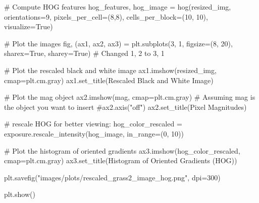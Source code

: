 \documentclass[
  letterpaper,
  DIV=11,
  numbers=noendperiod]{scrreprt}
\newenvironment{Shaded}{\begin{snugshade}}{\end{snugshade}}
\newcommand{\CommentTok}[1]{\textcolor[rgb]{0.37,0.37,0.37}{#1}}
\newcommand{\DecValTok}[1]{\textcolor[rgb]{0.68,0.00,0.00}{#1}}
\newcommand{\NormalTok}[1]{\textcolor[rgb]{0.00,0.23,0.31}{#1}}
\newcommand{\OperatorTok}[1]{\textcolor[rgb]{0.37,0.37,0.37}{#1}}
\newcommand{\StringTok}[1]{\textcolor[rgb]{0.13,0.47,0.30}{#1}}
\newcommand{\VariableTok}[1]{\textcolor[rgb]{0.07,0.07,0.07}{#1}}
\begin{document}
\begin{Shaded}
\begin{Highlighting}[]
\CommentTok{\# Compute HOG features}
\NormalTok{hog\_features, hog\_image }\OperatorTok{=}\NormalTok{ hog(resized\_img, orientations}\OperatorTok{=}\DecValTok{9}\NormalTok{, pixels\_per\_cell}\OperatorTok{=}\NormalTok{(}\DecValTok{8}\NormalTok{,}\DecValTok{8}\NormalTok{),}
\NormalTok{                              cells\_per\_block}\OperatorTok{=}\NormalTok{(}\DecValTok{10}\NormalTok{, }\DecValTok{10}\NormalTok{), visualize}\OperatorTok{=}\VariableTok{True}\NormalTok{)}

\CommentTok{\# Plot the images}
\NormalTok{fig, (ax1, ax2, ax3) }\OperatorTok{=}\NormalTok{ plt.subplots(}\DecValTok{3}\NormalTok{, }\DecValTok{1}\NormalTok{, figsize}\OperatorTok{=}\NormalTok{(}\DecValTok{8}\NormalTok{, }\DecValTok{20}\NormalTok{), sharex}\OperatorTok{=}\VariableTok{True}\NormalTok{, sharey}\OperatorTok{=}\VariableTok{True}\NormalTok{)  }\CommentTok{\# Changed 1, 2 to 3, 1}

\CommentTok{\# Plot the rescaled black and white image}
\NormalTok{ax1.imshow(resized\_img, cmap}\OperatorTok{=}\NormalTok{plt.cm.gray)}
\NormalTok{ax1.set\_title(}\StringTok{\textquotesingle{}Rescaled Black and White Image\textquotesingle{}}\NormalTok{)}

\CommentTok{\# Plot the mag object}
\NormalTok{ax2.imshow(mag, cmap}\OperatorTok{=}\NormalTok{plt.cm.gray)  }\CommentTok{\# Assuming mag is the object you want to insert}
\CommentTok{\#ax2.axis("off")}
\NormalTok{ax2.set\_title(}\StringTok{\textquotesingle{}Pixel Magnitudes\textquotesingle{}}\NormalTok{)}

\CommentTok{\# rescale HOG for better viewing:}
\NormalTok{hog\_color\_rescaled }\OperatorTok{=}\NormalTok{ exposure.rescale\_intensity(hog\_image, in\_range}\OperatorTok{=}\NormalTok{(}\DecValTok{0}\NormalTok{, }\DecValTok{10}\NormalTok{))}

\CommentTok{\# Plot the histogram of oriented gradients}
\NormalTok{ax3.imshow(hog\_color\_rescaled, cmap}\OperatorTok{=}\NormalTok{plt.cm.gray)}
\NormalTok{ax3.set\_title(}\StringTok{\textquotesingle{}Histogram of Oriented Gradients (HOG)\textquotesingle{}}\NormalTok{)}

\NormalTok{plt.savefig(}\StringTok{"images/plots/rescaled\_grass2\_image\_hog.png"}\NormalTok{, dpi}\OperatorTok{=}\DecValTok{300}\NormalTok{)}

\NormalTok{plt.show()}
\end{Highlighting}
\end{Shaded}
\end{document}
